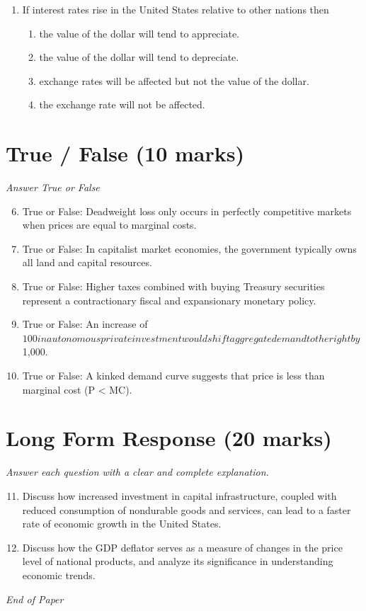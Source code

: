 \documentclass[12pt]{article}
\begin{document}
\begin{enumerate}[label=\arabic*.]
\begin{enumerate}[label=(\alph*)]
    \item Increasing the reserve ratio
    \item Buying government securities
    \item Lowering tariffs
\end{enumerate}
\item If interest rates rise in the United States relative to other nations then
\begin{enumerate}[label=(\alph*)]
    \item the value of the dollar will tend to appreciate.
    \item the value of the dollar will tend to depreciate.
    \item exchange rates will be affected but not the value of the dollar.
    \item the exchange rate will not be affected.
\end{enumerate}
\end{enumerate}

\section*{True / False (10 marks)}
\textit{Answer True or False}
\begin{enumerate}[label=\arabic*.]
\setcounter{enumi}{5}
\item True or False: Deadweight loss only occurs in perfectly competitive markets when prices are equal to marginal costs.
\item True or False: In capitalist market economies, the government typically owns all land and capital resources.
\item True or False: Higher taxes combined with buying Treasury securities represent a contractionary fiscal and expansionary monetary policy.
\item True or False: An increase of $100 in autonomous private investment would shift aggregate demand to the right by $1,000.
\item True or False: A kinked demand curve suggests that price is less than marginal cost (P \textless{} MC).
\end{enumerate}

\section*{Long Form Response (20 marks)}
\textit{Answer each question with a clear and complete explanation.}
\begin{enumerate}[label=\arabic*.]
\setcounter{enumi}{10}
\item Discuss how increased investment in capital infrastructure, coupled with reduced consumption of nondurable goods and services, can lead to a faster rate of economic growth in the United States.
\item Discuss how the GDP deflator serves as a measure of changes in the price level of national products, and analyze its significance in understanding economic trends.
\end{enumerate}

\vfill
\noindent\textit{End of Paper}
\end{document}
